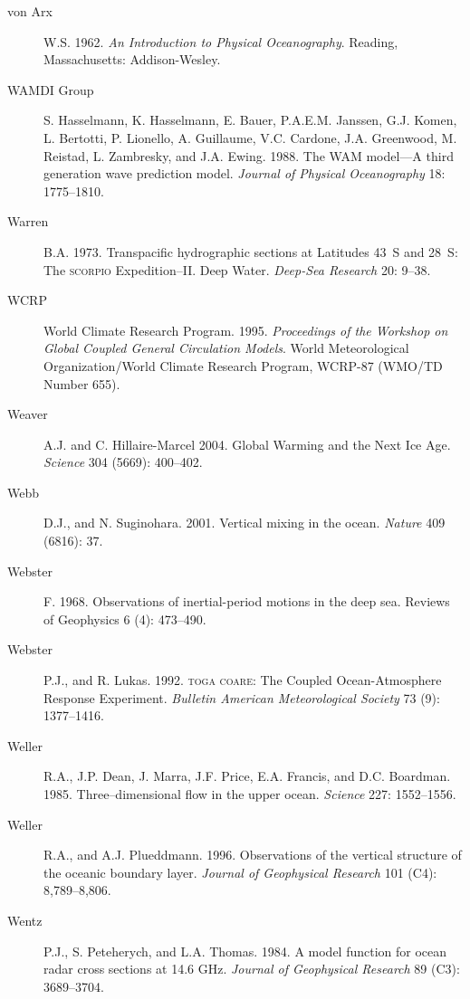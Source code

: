 \begin{description}
\item [von Arx]W.S. 1962. \textit{An Introduction  to Physical Oceanography}. Reading, Massachusetts: Addison-Wesley.

\item [WAMDI Group]S. Hasselmann, K. Hasselmann, E. Bauer, P.A.E.M. Jans\-sen,
G.J. Komen, L. Bertotti, P. Lionello, A. Guillaume, V.C. Cardone, J.A. Greenwood,
M. Reistad, L. Zambresky, and J.A. Ewing. 1988. The WAM model---A third
generation wave prediction model. \textit{Journal of Physical Oceanography} 18:
1775--1810.

\item [Warren]B.A. 1973. Transpacific hydrographic sections at Latitudes 43\degrees\ S and 28\degrees\ S: The \textsc{scorpio} Expedition--II. Deep Water. \textit{Deep-Sea Research} 20: 9--38.
	
\item [WCRP]World Climate Research Program. 1995. \textit{Proceedings of the Workshop on Global Coupled General Circulation Models}. World Meteorological Organization/World Climate Research
Program, WCRP-87 (WMO/TD Number 655).

\item [Weaver]A.J. and C. Hillaire-Marcel 2004. Global Warming and the Next Ice Age. \textit{Science} 304 (5669): 400--402.

\item [Webb]D.J., and N. Suginohara. 2001. Vertical mixing in the ocean.
\textit{Nature} 409 (6816): 37.

\item [Webster]F. 1968. Observations of inertial-period motions in the deep
sea. Reviews of Geophysics 6 (4): 473--490.

\item [Webster]P.J., and R. Lukas. 1992. \textsc{toga coare}: The Coupled
Ocean-Atmosphere Response Experiment. \textit{Bulletin American Meteorological
Society} 73 (9): 1377--1416.

\item [Weller]R.A., J.P. Dean, J. Marra, J.F. Price, E.A. Francis, and D.C.
Boardman. 1985. Three--dimensional flow in the upper ocean. \textit{Science} 227:
1552--1556.

\item [Weller]R.A., and A.J. Plueddmann. 1996. Observations of the vertical
structure of the oceanic boundary layer. \textit{Journal of Geophysical Research}
101 (C4): 8,789--8,806.

\item [Wentz]P.J., S. Peteherych, and L.A. Thomas. 1984. A model function for
ocean radar cross sections at 14.6 GHz. \textit{Journal of Geophysical Research}
89 (C3): 3689--3704.


\end{description}
